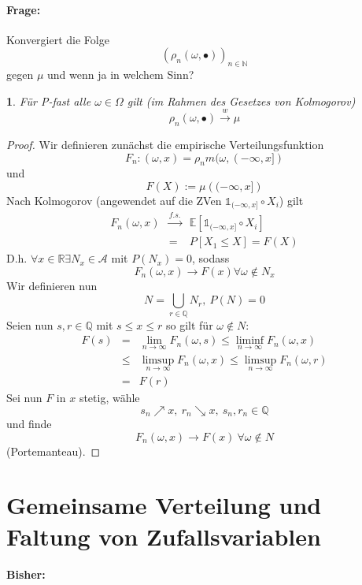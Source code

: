 \documentclass[10pt,a4paper]{report}
\numberwithin{equation}{section}
\numberwithin{figure}{section}
\theoremstyle{plain}
\theoremstyle{definition}
\theoremstyle{plain}
\newtheorem{prop}{\protect\propositionname}[section]
\theoremstyle{definition}
\theoremstyle{remark}
\theoremstyle{plain}
\theoremstyle{plain}
\theoremstyle{plain}
\theoremstyle{plain}
\theoremstyle{plain}
\providecommand{\propositionname}{Satz}
\newcommand{\1}{ \mathbb{1} } %
\begin{document}
\paragraph*{Frage:}

Konvergiert die Folge 
\[
\left(\rho_{n}\left(\omega,\bullet\right)\right)_{n\in\mathbb{N}}
\]
gegen $\mu$ und wenn ja in welchem Sinn?
\begin{prop}
Für P-fast alle $\omega\in\Omega$ gilt (im Rahmen des Gesetzes von
Kolmogorov)
\[
\rho_{n}\left(\omega,\bullet\right)\overset{w}{\longrightarrow}\mu
\]
\end{prop}
\begin{proof}
Wir definieren zunächst die empirische Verteilungsfunktion
\[
F_{n}:\left(\omega,x\right)=\rho_{n}m(\omega,(-\infty,x])
\]
und 
\[
F\left(X\right):=\mu\left((-\infty,x]\right)
\]
Nach Kolmogorov (angewendet auf die ZVen $\1_{(-\infty,x]}\circ X_{i}$)
gilt 
\begin{eqnarray*}
F_{n}\left(\omega,x\right) & \overset{f.s.}{\longrightarrow} & \mathbb{E}\left[\1_{(-\infty,x]}\circ X_{i}\right]\\
 & = & P\left[X_{1}\leq X\right]=F\left(X\right)
\end{eqnarray*}
D.h. $\forall x\in\mathbb{R}\exists N_{x}\in\mathcal{A}$ mit $P\left(N_{x}\right)=0$,
sodass 
\[
F_{n}\left(\omega,x\right)\to F\left(x\right)\forall\omega\notin N_{x}
\]
Wir definieren nun 
\[
N=\bigcup_{r\in\mathbb{Q}}N_{r},\ P\left(N\right)=0
\]
Seien nun $s,r\in\mathbb{Q}$ mit $s\leq x\leq r$ so gilt für $\omega\notin N$:
\begin{eqnarray*}
F\left(s\right) & = & \lim_{n\to\infty}F_{n}\left(\omega,s\right)\leq\liminf_{n\to\infty}F_{n}\left(\omega,x\right)\\
 & \leq & \limsup_{n\to\infty}F_{n}\left(\omega,x\right)\leq\limsup_{n\to\infty}F_{n}\left(\omega,r\right)\\
 & = & F\left(r\right)
\end{eqnarray*}
Sei nun $F$ in $x$ stetig, wähle 
\[
s_{n}\nearrow x,\ r_{n}\searrow x,\ s_{n},r_{n}\in\mathbb{Q}
\]
und finde 
\[
F_{n}\left(\omega,x\right)\to F\left(x\right)\ \forall\omega\notin N
\]
(Portemanteau).
\end{proof}

\section{Gemeinsame Verteilung und Faltung von Zufallsvariablen}


\paragraph*{Bisher: }
\end{document}
